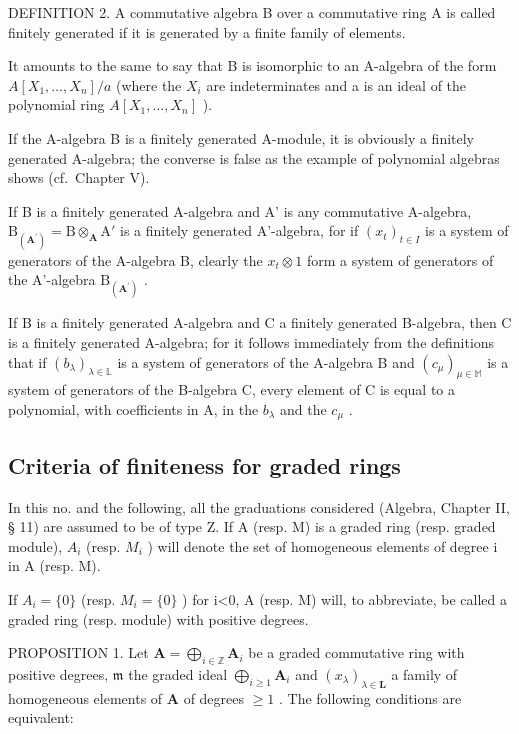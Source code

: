 DEFINITION 2. A commutative algebra B over a commutative ring A is called finitely generated if it is generated by a finite family of elements.

It amounts to the same to say that B is isomorphic to an A-algebra of the form \(A[X_{1},\ldots,X_{n}]/a\) (where the \(X_{i}\) are indeterminates and a is an ideal of the polynomial ring \(A[X_{1},\ldots,X_{n}]\) ).

If the A-algebra B is a finitely generated A-module, it is obviously a finitely generated A-algebra; the converse is false as the example of polynomial algebras shows (cf.~Chapter V).

If B is a finitely generated A-algebra and A' is any commutative A-algebra, \(\mathrm{B}_{(\mathbf{A}^{\prime})} = \mathrm{B} \otimes_{\mathbf{A}} \mathrm{A}'\) is a finitely generated A'-algebra, for if \((x_{t})_{t \in I}\) is a system of generators of the A-algebra B, clearly the \(x_{t} \otimes 1\) form a system of generators of the A'-algebra \(\mathrm{B}_{(\mathbf{A}^{\prime})}\) .

If B is a finitely generated A-algebra and C a finitely generated B-algebra, then C is a finitely generated A-algebra; for it follows immediately from the definitions that if \((b_{\lambda})_{\lambda \in \mathbb{L}}\) is a system of generators of the A-algebra B and \((c_{\mu})_{\mu \in \mathbb{M}}\) is a system of generators of the B-algebra C, every element of C is equal to a polynomial, with coefficients in A, in the \(b_{\lambda}\) and the \(c_{\mu}\) .

\subsection{Criteria of finiteness for graded rings}

In this no. and the following, all the graduations considered (Algebra, Chapter II, § 11) are assumed to be of type Z. If A (resp. M) is a graded ring (resp. graded module), \(A_{i}\) (resp. \(M_{i}\) ) will denote the set of homogeneous elements of degree i in A (resp. M).

If \(A_{i}=\{0\}\) (resp. \(M_{i}=\{0\}\) ) for i\textless0, A (resp. M) will, to abbreviate, be called a graded ring (resp. module) with positive degrees.

PROPOSITION 1. Let \(\mathbf{A} = \bigoplus_{i\in \mathbb{Z}}\mathbf{A}_i\) be a graded commutative ring with positive degrees, \(\mathfrak{m}\) the graded ideal \(\bigoplus_{i\geqslant 1}\mathbf{A}_i\) and \((x_{\lambda})_{\lambda \in \mathbf{L}}\) a family of homogeneous elements of \(\mathbf{A}\) of degrees \(\geqslant 1\) . The following conditions are equivalent:


